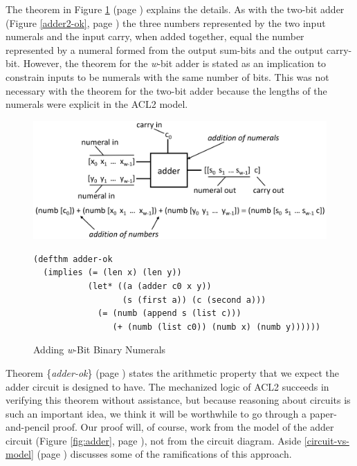 The theorem in Figure \ref{fig:adder-thm} (page \pageref{fig:adder-thm})
explains the details.
As with the two-bit adder (Figure \ref{adder2-ok}, page \pageref{adder2-ok})
the three numbers represented by the two input
numerals and the input carry, when added together,
equal the number represented
by a numeral formed from the output sum-bits and
the output carry-bit.
However, the theorem for the \emph{w}-bit adder
is stated as an implication to constrain
inputs to be numerals with the same number of bits.
This was not necessary with the theorem for the two-bit adder
because the lengths of the numerals were explicit in the ACL2 model.

\begin{figure}
\begin{center}
\includegraphics[scale=0.3]{Images/adder-thm.png}
\begin{Verbatim}
(defthm adder-ok
  (implies (= (len x) (len y))
           (let* ((a (adder c0 x y))
                  (s (first a)) (c (second a)))
             (= (numb (append s (list c)))
                (+ (numb (list c0)) (numb x) (numb y))))))
\end{Verbatim}
\end{center}
\caption{Adding \emph{w}-Bit Binary Numerals}
\label{fig:adder-thm}
\end{figure}

Theorem \{\emph{adder-ok}\} (page \pageref{fig:adder-thm})
states the arithmetic property that
we expect the adder circuit is designed to have.
The mechanized logic of ACL2 succeeds in verifying
this theorem without assistance,
but because reasoning about circuits is such an important idea,
we think it will be worthwhile to go through
a paper-and-pencil proof.
Our proof will, of course, work from
the model of the adder circuit
(Figure \ref{fig:adder}, page \pageref{fig:adder}),
not from the circuit diagram.
Aside \ref{circuit-vs-model} (page \pageref{circuit-vs-model})
discusses some of the ramifications of this approach.


